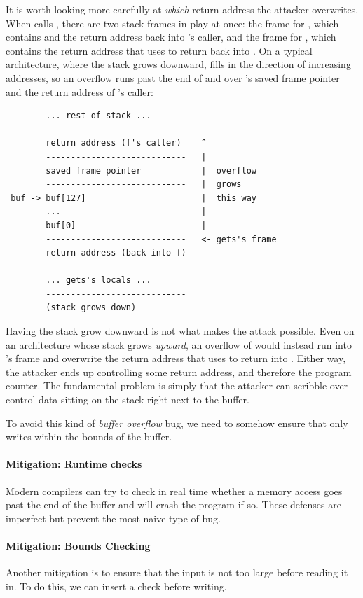 It is worth looking more carefully at \emph{which} return address the
attacker overwrites. When  calls , there are two
stack frames in play at once: the frame for , which contains
 and the return address back into 's caller, and the
frame for , which contains the return address that 
uses to return back into . On a typical architecture, where the
stack grows downward,  fills  in the direction of
increasing addresses, so an overflow runs past the end of  and
over 's saved frame pointer and the return address of 's
caller:
\begin{verbatim}
        ... rest of stack ...
        ----------------------------
        return address (f's caller)    ^
        ----------------------------   |
        saved frame pointer            |  overflow
        ----------------------------   |  grows
 buf -> buf[127]                       |  this way
        ...                            |
        buf[0]                         |
        ----------------------------   <- gets's frame
        return address (back into f)
        ----------------------------
        ... gets's locals ...
        ----------------------------
        (stack grows down)
\end{verbatim}

Having the stack grow downward is not what makes the attack possible.
Even on an architecture whose stack grows \emph{upward}, an overflow of
 would instead run into 's frame and overwrite the
return address that  uses to return into . Either way,
the attacker ends up controlling some return address, and therefore the
program counter. The fundamental problem is simply that the attacker can
scribble over control data sitting on the stack right next to the
buffer.

To avoid this kind of \emph{buffer overflow} bug, we need to somehow ensure that
 only writes within the bounds of the buffer. 

\paragraph{Mitigation: Runtime checks}
Modern compilers can try to check in real time whether a memory access goes
past the end of the buffer and will crash the program if so. 
These defenses are imperfect but prevent the most naive type of bug.

\paragraph{Mitigation: Bounds Checking}
Another mitigation is to ensure that the input is not too large before reading it in.
To do this, we can insert a check before writing. 

